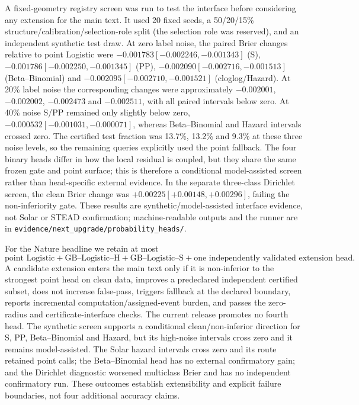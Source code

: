 \documentclass[11pt,a4paper]{article}
\numberwithin{equation}{section}
\theoremstyle{definition}\newtheorem{definition}[theorem]{Definition}
\theoremstyle{remark}\newtheorem{remark}[theorem]{Remark}
\begin{document}
A fixed-geometry registry screen was run to test the interface before considering any extension for the main text. It used 20 fixed seeds, a 50/20/15\% structure/calibration/selection-role split (the selection role was reserved), and an independent synthetic test draw. At zero label noise, the paired Brier changes relative to point Logistic were $-0.001783[-0.002246,-0.001343]$ (S), $-0.001786[-0.002250,-0.001345]$ (PP), $-0.002090[-0.002716,-0.001513]$ (Beta--Binomial) and $-0.002095[-0.002710,-0.001521]$ (cloglog/Hazard). At 20\% label noise the corresponding changes were approximately $-0.002001$, $-0.002002$, $-0.002473$ and $-0.002511$, with all paired intervals below zero. At 40\% noise S/PP remained only slightly below zero, $-0.000532[-0.001031,-0.000071]$, whereas Beta--Binomial and Hazard intervals crossed zero. The certified test fraction was 13.7\%, 13.2\% and 9.3\% at these three noise levels, so the remaining queries explicitly used the point fallback. The four binary heads differ in how the local residual is coupled, but they share the same frozen gate and point surface; this is therefore a conditional model-assisted screen rather than head-specific external evidence. In the separate three-class Dirichlet screen, the clean Brier change was $+0.00225[+0.00148,+0.00296]$, failing the non-inferiority gate. These results are synthetic/model-assisted interface evidence, not Solar or STEAD confirmation; machine-readable outputs and the runner are in \texttt{evidence/next\_upgrade/probability\_heads/}.


For the Nature headline we retain at most
\[
 \text{point Logistic}+\text{GB--Logistic--H}+\text{GB--Logistic--S}
 +\text{one independently validated extension head}.
\]
A candidate extension enters the main text only if it is non-inferior to the strongest point head on clean data, improves a predeclared independent certified subset, does not increase false-pass, triggers fallback at the declared boundary, reports incremental computation/assigned-event burden, and passes the zero-radius and certificate-interface checks. The current release promotes no fourth head. The synthetic screen supports a conditional clean/non-inferior direction for S, PP, Beta--Binomial and Hazard, but its high-noise intervals cross zero and it remains model-assisted. The Solar hazard intervals cross zero and its route retained point calls; the Beta--Binomial head has no external confirmatory gain; and the Dirichlet diagnostic worsened multiclass Brier and has no independent confirmatory run. These outcomes establish extensibility and explicit failure boundaries, not four additional accuracy claims.
\end{document}
